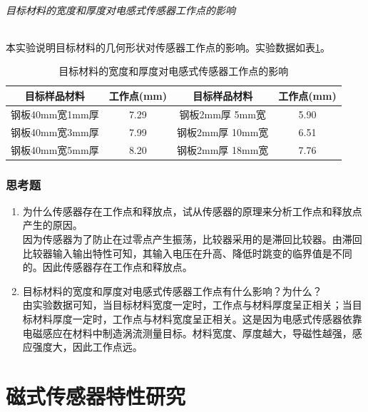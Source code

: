 	\paragraph{目标材料的宽度和厚度对电感式传感器工作点的影响}
	本实验说明目标材料的几何形状对传感器工作点的影响。实验数据如表\ref{tab:swt}。
	\begin{table}[htbp]
		\centering
		\begin{tabular}{|c|c|c|c|}
			\hline
			目标样品材料 & 工作点(mm) & 目标样品材料 & 工作点(mm) \\
			\hline
			钢板40mm宽1mm厚 &7.29 & 钢板2mm厚 5mm宽 & 5.90 \\
			钢板40mm宽3mm厚 &7.99 & 钢板2mm厚 10mm宽 & 6.51 \\
			钢板40mm宽5mm厚 &8.20 & 钢板2mm厚 18mm宽 & 7.76 \\
			\hline
		\end{tabular}
		\caption{目标材料的宽度和厚度对电感式传感器工作点的影响}
		\label{tab:swt}
	\end{table}

	\section{思考题}
	\begin{enumerate}
	\item 为什么传感器存在工作点和释放点，试从传感器的原理来分析工作点和释放点产生的原因。\\
	因为传感器为了防止在过零点产生振荡，比较器采用的是滞回比较器。由滞回比较器输入输出特性可知，其输入电压在升高、降低时跳变的临界值是不同的。因此传感器存在工作点和释放点。
	\item 目标材料的宽度和厚度对电感式传感器工作点有什么影响？为什么？\\
	由实验数据可知，当目标材料宽度一定时，工作点与材料厚度呈正相关；当目标材料厚度一定时，工作点与材料宽度呈正相关。这是因为电感式传感器依靠电磁感应在材料中制造涡流测量目标。材料宽度、厚度越大，导磁性越强，感应强度大，因此工作点远。
	\end{enumerate}

\part{磁式传感器特性研究}
